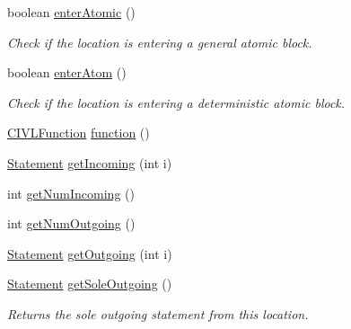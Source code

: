 \begin{DoxyCompactItemize}
boolean \hyperlink{classedu_1_1udel_1_1cis_1_1vsl_1_1civl_1_1model_1_1common_1_1location_1_1CommonLocation_a636595da9a3680969839b5900033e059}{enter\+Atomic} ()
\begin{DoxyCompactList}\small\item\em Check if the location is entering a general atomic block. \end{DoxyCompactList}\item 
boolean \hyperlink{classedu_1_1udel_1_1cis_1_1vsl_1_1civl_1_1model_1_1common_1_1location_1_1CommonLocation_ad79782b8ddd887db635479f687e468d2}{enter\+Atom} ()
\begin{DoxyCompactList}\small\item\em Check if the location is entering a deterministic atomic block. \end{DoxyCompactList}\item 
\hyperlink{interfaceedu_1_1udel_1_1cis_1_1vsl_1_1civl_1_1model_1_1IF_1_1CIVLFunction}{C\+I\+V\+L\+Function} \hyperlink{classedu_1_1udel_1_1cis_1_1vsl_1_1civl_1_1model_1_1common_1_1location_1_1CommonLocation_a74519695987b194ef8a5db4926706be2}{function} ()
\item 
\hyperlink{interfaceedu_1_1udel_1_1cis_1_1vsl_1_1civl_1_1model_1_1IF_1_1statement_1_1Statement}{Statement} \hyperlink{classedu_1_1udel_1_1cis_1_1vsl_1_1civl_1_1model_1_1common_1_1location_1_1CommonLocation_aabb93e8580c602a9c5ea4f67d8d36197}{get\+Incoming} (int i)
\item 
int \hyperlink{classedu_1_1udel_1_1cis_1_1vsl_1_1civl_1_1model_1_1common_1_1location_1_1CommonLocation_ac1521171c70b6dd534eec64199a29bea}{get\+Num\+Incoming} ()
\item 
int \hyperlink{classedu_1_1udel_1_1cis_1_1vsl_1_1civl_1_1model_1_1common_1_1location_1_1CommonLocation_a66e5aa9f09b9d370697dacf3e6930481}{get\+Num\+Outgoing} ()
\item 
\hyperlink{interfaceedu_1_1udel_1_1cis_1_1vsl_1_1civl_1_1model_1_1IF_1_1statement_1_1Statement}{Statement} \hyperlink{classedu_1_1udel_1_1cis_1_1vsl_1_1civl_1_1model_1_1common_1_1location_1_1CommonLocation_acde4cbde02b6db42bdc150e4429585e7}{get\+Outgoing} (int i)
\item 
\hyperlink{interfaceedu_1_1udel_1_1cis_1_1vsl_1_1civl_1_1model_1_1IF_1_1statement_1_1Statement}{Statement} \hyperlink{classedu_1_1udel_1_1cis_1_1vsl_1_1civl_1_1model_1_1common_1_1location_1_1CommonLocation_a73c5d42039fbca2aea6b2376fe26bfa9}{get\+Sole\+Outgoing} ()
\begin{DoxyCompactList}\small\item\em Returns the sole outgoing statement from this location. \end{DoxyCompactList}\item 

\end{DoxyCompactItemize}

